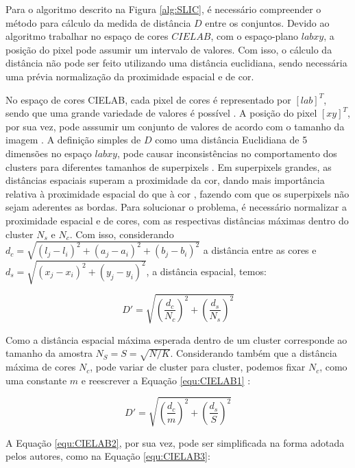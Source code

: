 \begin{document}
Para o algoritmo descrito na Figura \ref{alg:SLIC}, é necessário compreender o método para cálculo da medida de distância $D$ entre os conjuntos. Devido ao algoritmo trabalhar no espaço de cores $CIELAB$, com o espaço-plano $labxy$, a posição do pixel pode assumir um intervalo de valores. Com isso, o cálculo da distância não pode ser feito utilizando uma distância euclidiana, sendo necessária uma prévia normalização da proximidade espacial e de cor. 

No espaço de cores CIELAB, cada pixel de cores é representado por $[l a b]^T$, sendo que uma grande variedade de valores é possível \cite{SLIC}. A posição do pixel $[x y]^T$, por sua vez, pode asssumir um conjunto de valores de acordo com o tamanho da imagem \cite{SLIC}. A definição simples de $D$ como uma distância Euclidiana de 5 dimensões no espaço $labxy$, pode causar inconsistências no comportamento dos clusters para diferentes tamanhos de superpixels \cite{SLIC}. Em superpixels grandes, as distâncias espaciais superam a proximidade da cor, dando mais importância relativa à proximidade espacial do que à cor \cite{SLIC}, fazendo com que os superpixels não sejam aderentes as bordas. Para solucionar o problema, é necessário normalizar a proximidade espacial e de cores, com as respectivas distâncias máximas dentro do cluster $N_s$ e $N_c$. Com isso, considerando $d_c = \sqrt{(l_j - l_i)^2 + (a_j - a_i)^2 + (b_j - b_i)^2}$ a distância entre as cores e $d_s =  \sqrt{(x_j - x_i)^2 + (y_j - y_i)^2}$, a distância espacial, temos:

\begin{equation}
 D' = \sqrt{ \left(\frac{d_c}{N_c} \right)^2 + \left(\frac{d_s}{N_s} \right)^2}
 \label{equ:CIELAB1}
\end{equation}

Como a distância espacial máxima esperada dentro de um cluster corresponde ao tamanho da amostra $N_S = S = \sqrt{N/K}$. Considerando também que a distância máxima de cores $N_c$, pode variar de cluster para cluster, podemos fixar $N_c$, como uma constante $m$ e reescrever a Equação \ref{equ:CIELAB1} \cite{SLIC}:

\begin{equation}
 D' = \sqrt{ \left(\frac{d_c}{m} \right)^2 + \left(\frac{d_s}{S} \right)^2}
 \label{equ:CIELAB2}
\end{equation}

A Equação \ref{equ:CIELAB2}, por sua vez, pode ser simplificada na forma adotada pelos autores, como na Equação \ref{equ:CIELAB3}:
\end{document}
